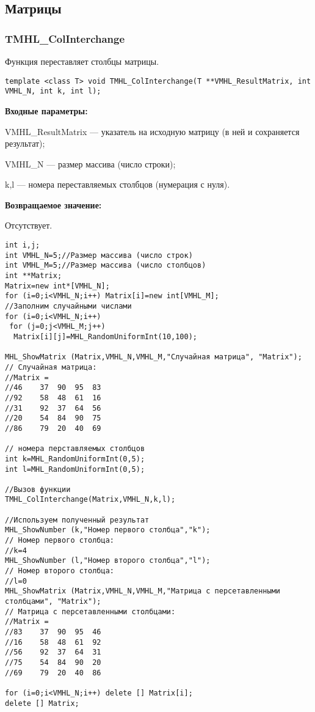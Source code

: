 \documentclass[a4paper,12pt]{article}
\begin{document}
\subsection{Матрицы}

\subsubsection{TMHL\_ColInterchange}\label{TMHL_ColInterchange}

Функция переставляет столбцы матрицы.


\begin{lstlisting}[label=code_syntax_TMHL_ColInterchange,caption=Синтаксис]
template <class T> void TMHL_ColInterchange(T **VMHL_ResultMatrix, int VMHL_N, int k, int l);
\end{lstlisting}

\textbf{Входные параметры:} 
 
VMHL\_ResultMatrix --- указатель на исходную матрицу (в ней и сохраняется результат);
 
VMHL\_N --- размер массива (число строки);
 
k,l --- номера переставляемых столбцов (нумерация с нуля).

\textbf{Возвращаемое значение:}

Отсутствует.


\begin{lstlisting}[label=code_use_TMHL_ColInterchange,caption=Пример использования]
int i,j;
int VMHL_N=5;//Размер массива (число строк)
int VMHL_M=5;//Размер массива (число столбцов)
int **Matrix;
Matrix=new int*[VMHL_N];
for (i=0;i<VMHL_N;i++) Matrix[i]=new int[VMHL_M];
//Заполним случайными числами
for (i=0;i<VMHL_N;i++)
 for (j=0;j<VMHL_M;j++)
  Matrix[i][j]=MHL_RandomUniformInt(10,100);

MHL_ShowMatrix (Matrix,VMHL_N,VMHL_M,"Случайная матрица", "Matrix");
// Случайная матрица:
//Matrix =	
//46	37	90	95	83
//92	58	48	61	16
//31	92	37	64	56
//20	54	84	90	75
//86	79	20	40	69

// номера перставляемых столбцов
int k=MHL_RandomUniformInt(0,5);
int l=MHL_RandomUniformInt(0,5);

//Вызов функции
TMHL_ColInterchange(Matrix,VMHL_N,k,l);

//Используем полученный результат
MHL_ShowNumber (k,"Номер первого столбца","k");
// Номер первого столбца:
//k=4
MHL_ShowNumber (l,"Номер второго столбца","l");
// Номер второго столбца:
//l=0
MHL_ShowMatrix (Matrix,VMHL_N,VMHL_M,"Матрица с персетавленными столбцами", "Matrix");
// Матрица с персетавленными столбцами:
//Matrix =	
//83	37	90	95	46
//16	58	48	61	92
//56	92	37	64	31
//75	54	84	90	20
//69	79	20	40	86

for (i=0;i<VMHL_N;i++) delete [] Matrix[i];
delete [] Matrix;
\end{lstlisting}
\end{document}
